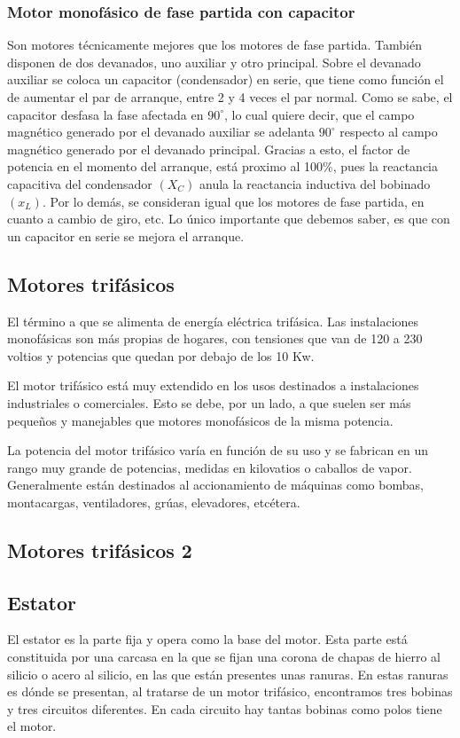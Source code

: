 \subsubsection{Motor monofásico de fase partida con capacitor}

Son motores técnicamente mejores que los motores de fase partida. También disponen de dos devanados, uno auxiliar y otro principal. Sobre el devanado auxiliar se coloca un capacitor (condensador) en serie, que tiene como función el de aumentar el par de arranque, entre 2 y 4 veces el par normal. Como se sabe, el capacitor desfasa la fase afectada en $90^{\circ}$, lo cual quiere decir, que el campo magnético generado por el devanado auxiliar se adelanta $90^{\circ}$ respecto al campo magnético generado por el devanado principal. Gracias a esto, el factor de potencia en el momento del arranque, está proximo al 100\%, pues la reactancia capacitiva del condensador $(X_C)$ anula la reactancia inductiva del bobinado $(x_L)$. Por lo demás, se consideran igual que los motores de fase partida, en cuanto a cambio de giro, etc. Lo único importante que debemos saber, es que con un capacitor en serie se mejora el arranque.

\subsection{Motores trifásicos}

El término a que se alimenta de energía eléctrica trifásica. Las instalaciones monofásicas son más propias de hogares, con tensiones que van de 120 a 230 voltios y potencias que quedan por debajo de los 10 Kw.

El motor trifásico está muy extendido en los usos destinados a instalaciones industriales o comerciales. Esto se debe, por un lado, a que suelen ser más pequeños y manejables que motores monofásicos de la misma potencia.

La potencia del motor trifásico varía en función de su uso y se fabrican en un rango muy grande de potencias, medidas en kilovatios o caballos de vapor. Generalmente están destinados al accionamiento de máquinas como bombas, montacargas, ventiladores, grúas, elevadores, etcétera.

\subsection{Motores trifásicos 2}

\subsection{Estator}
El estator es la parte fija y opera como la base del motor. Esta parte está constituida por una carcasa en la que se fijan una corona de chapas de hierro al silicio o acero al silicio, en las que están presentes unas ranuras. En estas ranuras es dónde se presentan, al tratarse de un motor trifásico, encontramos tres bobinas y tres circuitos diferentes. En cada circuito hay tantas bobinas como polos tiene el motor.

